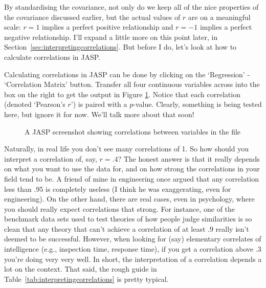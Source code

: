 By standardising the covariance, not only do we keep all of the nice properties of the covariance discussed earlier, but the actual values of $r$ are on a meaningful scale: $r= 1$ implies a perfect positive relationship and $r = -1$ implies a perfect negative relationship. I'll expand a little more on this point later, in Section~\ref{sec:interpretingcorrelations}. But before I do, let's look at how to calculate correlations in JASP.


Calculating correlations in JASP can be done by clicking on the `Regression' - `Correlation Matrix' button. Transfer all four continuous variables across into the box on the right to get the output in Figure \ref{fig:correlations}.  Notice that each correlation (denoted `Pearson's $r$') is paired with a $p$-value.  Clearly, something is being tested here, but ignore it for now. We'll talk more about that soon!

\vspace{1cm}
\begin{figure}[!htb]
\begin{center}
\caption{A JASP screenshot showing correlations between variables in the  file}
\label{fig:correlations}
\HR
\end{center}
\end{figure}

 
Naturally, in real life you don't see many correlations of 1. So how should you interpret a correlation of, say, $r= .4$? The honest answer is that it really depends on what you want to use the data for, and on how strong the correlations in your field tend to be. A  friend of mine in engineering once argued that any correlation less than $.95$ is completely useless (I think he was exaggerating, even for engineering). On the other hand, there are real cases, even in psychology, where you should really expect correlations that strong. For instance, one of the benchmark data sets used to test theories of how people judge similarities is so clean that any theory that can't achieve a correlation of at least $.9$ really isn't deemed to be successful. However, when looking for (say) elementary correlates of intelligence (e.g., inspection time, response time), if you get a correlation above $.3$ you're doing very very well. In short, the interpretation of a correlation depends a lot on the context. That said, the rough guide in Table~\ref{tab:interpretingcorrelations} is pretty typical.

